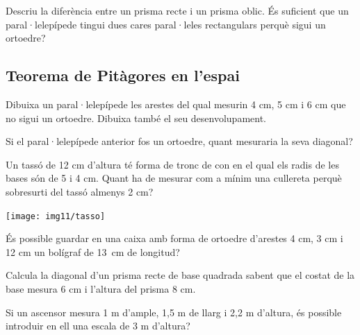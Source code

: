 \begin{activitats}
\begin{mylist}
\exer  Descriu la diferència entre un prisma recte i un prisma oblic. És suficient que un paral·lelepípede tingui dues cares paral·leles rectangulars perquè sigui un ortoedre?

 
\end{mylist}

\columnbreak
\subsection{Teorema de Pitàgores en l'espai}

\begin{mylist}
\exer Dibuixa un paral·lelepípede les arestes del qual mesurin 4 cm, 5 cm i 6 cm que no sigui un ortoedre. Dibuixa també el seu desenvolupament.


\exer  Si el paral·lelepípede anterior fos un ortoedre, quant mesuraria la seva diagonal? 


\exer  Un tassó de 12 cm d'altura té forma de tronc de con en el qual els radis de les bases són de 5 i 4 cm. Quant ha de mesurar com a mínim una cullereta perquè sobresurti del tassó almenys 2 cm?

\begin{center}
\texttt{[image: img11/tasso]}
\end{center}

\answers{17 cm}

\exer  És possible guardar en una caixa amb forma de ortoedre d'arestes 4 cm, 3 cm i 12 cm un bolígraf de 13~cm de longitud?



\exer  Calcula la diagonal d'un prisma recte de base quadrada sabent que el costat de la base mesura 6 cm i l'altura del prisma 8 cm.


\exer  Si un ascensor mesura 1 m d'ample, 1,5 m de llarg i 2,2 m d'altura, és possible introduir en ell una escala de 3 m d'altura?


\end{mylist}
\end{activitats}
